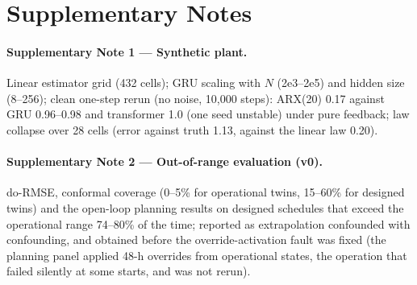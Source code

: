 \documentclass[11pt]{article}
\begin{document}
\begin{center}\scriptsize{}\end{center}


\section*{Supplementary Notes}
\paragraph{Supplementary Note 1 --- Synthetic plant.} Linear estimator grid (432 cells); GRU scaling with $N$ (2e3--2e5) and hidden size (8--256); clean one-step rerun (no noise, 10,000 steps): ARX(20) 0.17 against GRU 0.96--0.98 and transformer 1.0 (one seed unstable) under pure feedback; law collapse over 28 cells (error against truth 1.13, against the linear law 0.20).

\paragraph{Supplementary Note 2 --- Out-of-range evaluation (v0).} do-RMSE, conformal coverage (0--5\% for operational twins, 15--60\% for designed twins) and the open-loop planning results on designed schedules that exceed the operational range 74--80\% of the time; reported as extrapolation confounded with confounding, and obtained before the override-activation fault was fixed (the planning panel applied 48-h overrides from operational states, the operation that failed silently at some starts, and was not rerun).
\end{document}
